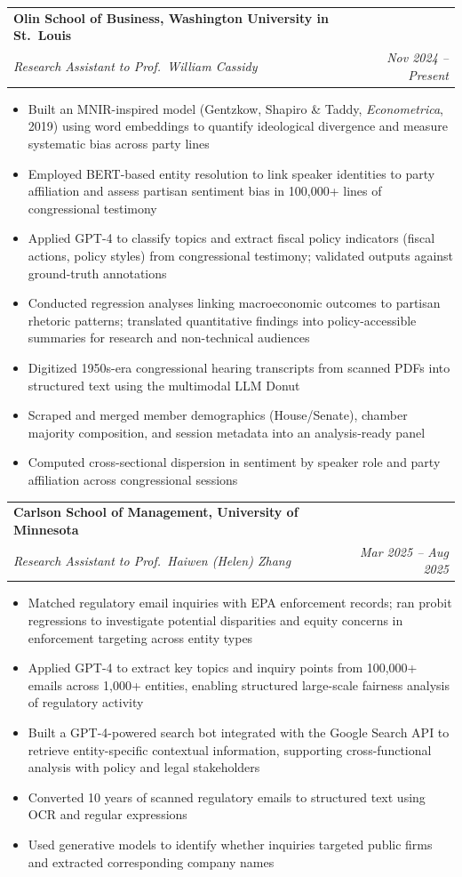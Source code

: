 \documentclass[letterpaper,11pt]{article}
\makeatletter
\newcommand{\resumeItem}[1]{
  \item\small{#1 \vspace{-2pt}}
}
\newcommand{\resumeSubheading}[4]{
  \vspace{-2pt}\item
    \begin{tabular*}{0.97\textwidth}[t]{l@{\extracolsep{\fill}}r}
      \textbf{#1} & \small #2 \\
      \textit{\small#3} & \textit{\small #4} \\
    \end{tabular*}\vspace{-7pt}
}
\newcommand{\resumeItemListStart}{\begin{itemize}}
\newcommand{\resumeItemListEnd}{\end{itemize}\vspace{-5pt}}
\makeatother
\begin{document}
  \resumeSubheading
    {Olin School of Business, Washington University in St.\ Louis}{}
    {Research Assistant to Prof.\ William Cassidy \normalfont{(Empirical Macro-Finance)}}{Nov 2024 -- Present}
    \resumeItemListStart
      \resumeItem{Built an MNIR-inspired model (Gentzkow, Shapiro \& Taddy, \textit{Econometrica}, 2019) using word embeddings to quantify ideological divergence and measure systematic bias across party lines}
      \resumeItem{Employed BERT-based entity resolution to link speaker identities to party affiliation and assess partisan sentiment bias in 100,000+ lines of congressional testimony}
      \resumeItem{Applied GPT-4 to classify topics and extract fiscal policy indicators (fiscal actions, policy styles) from congressional testimony; validated outputs against ground-truth annotations}
      \resumeItem{Conducted regression analyses linking macroeconomic outcomes to partisan rhetoric patterns; translated quantitative findings into policy-accessible summaries for research and non-technical audiences}
      \resumeItem{Digitized 1950s-era congressional hearing transcripts from scanned PDFs into structured text using the multimodal LLM Donut}
      \resumeItem{Scraped and merged member demographics (House/Senate), chamber majority composition, and session metadata into an analysis-ready panel}
      \resumeItem{Computed cross-sectional dispersion in sentiment by speaker role and party affiliation across congressional sessions}
    \resumeItemListEnd

  \resumeSubheading
    {Carlson School of Management, University of Minnesota}{}
    {Research Assistant to Prof.\ Haiwen (Helen) Zhang \normalfont{(Environmental Enforcement)}}{Mar 2025 -- Aug 2025}
    \resumeItemListStart
      \resumeItem{Matched regulatory email inquiries with EPA enforcement records; ran probit regressions to investigate potential disparities and equity concerns in enforcement targeting across entity types}
      \resumeItem{Applied GPT-4 to extract key topics and inquiry points from 100,000+ emails across 1,000+ entities, enabling structured large-scale fairness analysis of regulatory activity}
      \resumeItem{Built a GPT-4-powered search bot integrated with the Google Search API to retrieve entity-specific contextual information, supporting cross-functional analysis with policy and legal stakeholders}
      \resumeItem{Converted 10 years of scanned regulatory emails to structured text using OCR and regular expressions}
      \resumeItem{Used generative models to identify whether inquiries targeted public firms and extracted corresponding company names}
    \resumeItemListEnd
\end{document}
